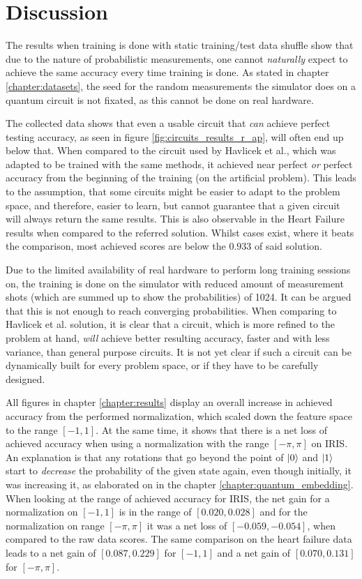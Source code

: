 \clearpage
\section{Discussion}
The results when training is done with static training/test data shuffle show that due to the nature of probabilistic measurements, one cannot \emph{naturally} expect to achieve the same accuracy every time training is done. As stated in chapter \ref{chapter:datasets}, the seed for the random measurements the simulator does on a quantum circuit is not fixated, as this cannot be done on real hardware.\par 
The collected data shows that even a usable circuit that \emph{can} achieve perfect testing accuracy, as seen in figure \ref{fig:circuits_results_r_ap}, will often end up below that. When compared to the circuit used by Havlicek et al.\cite{havlicek_supervised_2019}, which was adapted to be trained with the same methods, it achieved near perfect \emph{or} perfect accuracy from the beginning of the training (on the artificial problem). This leads to the assumption, that some circuits might be easier to adapt to the problem space, and therefore, easier to learn, but cannot guarantee that a given circuit will always return the same results. This is also observable in the Heart Failure results when compared to the referred solution. Whilst cases exist, where it beats the comparison, most achieved scores are below the $0.933$ of said solution.\par 
Due to the limited availability of real hardware to perform long training sessions on, the training is done on the simulator with reduced amount of measurement shots (which are summed up to show the probabilities) of 1024. It can be argued that this is not enough to reach converging probabilities. When comparing to Havlicek et al. solution, it is clear that a circuit, which is more refined to the problem at hand, \emph{will} achieve better resulting accuracy, faster and with less variance, than general purpose circuits. It is not yet clear if such a circuit can be dynamically built for every problem space, or if they have to be carefully designed.\par
All figures in chapter \ref{chapter:results} display an overall increase in achieved accuracy from the performed normalization, which scaled down the feature space to the range $[-1,1]$. At the same time, it shows that there is a net loss of achieved accuracy when using a normalization with the range $[-\pi,\pi]$ on IRIS. An explanation is that any rotations that go beyond the point of $\ket{0}$ and $\ket{1}$ start to \emph{decrease} the probability of the given state again, even though initially, it was increasing it, as elaborated on in the chapter \ref{chapter:quantum_embedding}. When looking at the range of achieved accuracy for IRIS, the net gain for a normalization on $[-1,1]$ is in the range of $[0.020,0.028]$ and for the normalization on range $[-\pi,\pi]$ it was a net loss of $[-0.059,-0.054]$, when compared to the raw data scores. The same comparison on the heart failure data leads to a net gain of $[0.087, 0.229]$ for $[-1,1]$ and a net gain of $[0.070,0.131]$ for $[-\pi,\pi]$. \par
